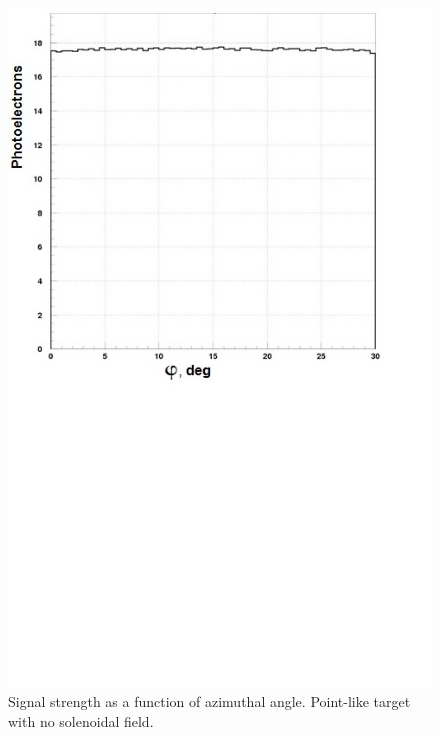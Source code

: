 \begin{figure}[!ht]
    \centering
    \includegraphics[width=1.0\linewidth,trim={0.0cm 9.4cm 0.0cm 0.0cm},clip]{images/Point_Targ_Zero_Field_Phi.jpg}
    \caption{Signal strength as a function of azimuthal angle. Point-like target with no solenoidal field.}
    \label{fig:Point_Targ_Zero_Field_Phi}
\end{figure}

